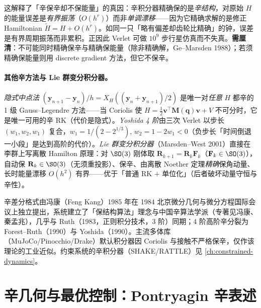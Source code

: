 \begin{insight}
这解释了「辛保辛却不保能量」的真因：辛积分器精确保的是\emph{辛结构}，对原始 $H$ 的能量误差是\emph{有界振荡}（$O(h^r)$）而非\emph{单调漂移}——因为它精确求解的是修正 Hamiltonian $\tilde H=H+O(h^r)$。如同一只「略有偏差却齿轮比精确」的钟，误差是有界周期振荡而非累积。正因此 Verlet 可做 $10^9$ 步行星仿真而不失真。\textbf{需厘清}：不可能同时精确保辛与精确保能量（除非精确解，Ge--Marsden 1988）；若须精确保能量则用 discrete gradient 方法，但它不保辛。
\end{insight}

\paragraph{其他辛方法与 Lie 群变分积分器。}
\emph{隐式中点法} $(\mathbf y_{n+1}-\mathbf y_n)/h=X_H((\mathbf y_n+\mathbf y_{n+1})/2)$ 是唯一对\emph{任意} $H$ 都辛的 1 级 Gauss--Legendre 方法——当 Coriolis 使 $H=\tfrac12\mathbf v^\top\mathbf M(\mathbf q)\mathbf v+V$ 不可分时，它是唯一可用的辛 RK（代价是隐式）。\emph{Yoshida 4 阶}由三次 Verlet 以步长 $(w_1,w_2,w_1)$ 复合，$w_1=1/(2-2^{1/3}),\,w_2=1-2w_1<0$（负步长「时间倒退一小段」是达到高阶的代价）\cite{yoshida1990construction}。\emph{Lie 群变分积分器}（Marsden--West 2001\cite{marsden2001discrete}）直接在李群上写离散 Hamilton 原理：对 $\SO(3)$ 刚体取 $\mathbf R_{k+1}=\mathbf R_k\mathbf F_k$（$\mathbf F_k\in\SO(3)$），自动保 $\mathbf R_k\in\SO(3)$（无须重投影）、保辛、由离散 Noether 定理\emph{精确}保角动量、长时能量漂移 $O(h^2)$ 有界——优于「普通 RK $+$ 单位化」（后者破坏动量守恒与辛性）。

\begin{remark}[归属与库的辛性]
辛差分格式由冯康（Feng Kang）1985 年在 1984 北京微分几何与微分方程国际会议上独立提出\cite{feng1985difference}，系统建立了「保结构算法」理念与中国辛算法学派（专著见冯康、秦孟兆\cite{feng2003symplectic}），几乎与 Ruth（1983，正则积分技术，3 阶\cite{ruth1983canonical}）同期；4 阶高阶辛分裂为 Forest--Ruth（1990\cite{forest1990fourth}）与 Yoshida（1990）。主流多体库（MuJoCo/Pinocchio/Drake）默认积分器因 Coriolis 与接触不严格保辛，仅作该理论的工业近似。约束系统的辛积分器（SHAKE/RATTLE）见 \cref{ch:constrained-dynamics}。
\end{remark}

\section{辛几何与最优控制：Pontryagin 辛表述}
\label{sec:gm-pontryagin}

